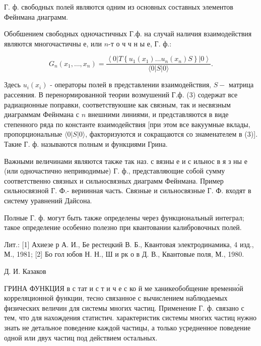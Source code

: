 \documentclass[10pt]{article}
\begin{document}
Г. ф. свободных полей являются одним из основных составных элементов Фейнмана диаграмм.



Обобшением свободных одночастичных Г.ф. на случай наличия взаимодействия являются многочастичны е, или $n$-т о ч ч н ы е, Г. ф.:



\[

G_{n}\left(x_{1}, \ldots, x_{n}\right)=\frac{\left\langle 0\left|T\left\{u_{1}\left(x_{1}\right) \ldots u_{n}\left(x_{n}\right) S\right\}\right| 0\right\rangle}{\langle 0|S| 0\rangle} .

\]



Здесь $u_{i}\left(x_{i}\right)$ - операторы полей в представлении взаимодействия, $S-$ матрица рассеяния. В перенормированной теории возмушений Г.ф. (3) содержат все радиационные поправки, соответствуюшие как связным, так и несвязным диаграммам Фейнмана с $n$ внешними линиями, и представляются в виде степенного ряда по константе взаимодействия [при этом все вакуумные вклады, пропорциональные $\langle 0|S| 0\rangle$, факторизуются и сокращаются со знаменателем в (3)]. Такие Г. ф. называются полным и функциями Грина.



Важными величинами являются также так наз. с вязны е и с ильнос в я з ны е (или одночастично неприводимые) Г. ф., представляющие собой сумму соответственно связных и сильносвязных диаграмм Фейнмана. Пример сильносвязной Г. Ф.- вериинная часть. Связные и сильносвязные Г. Ф. входят в систему уравнений Дайсона.



Полные Г. ф. могут быть также определены через функциональный интеграл; такое определение особенно полезно при квантовании калибровочных полей.



Лит.: [1] Ахиезе р А. И., Бе рестецкий В. Б., Квантовая электродинамика, 4 изд., М., 1981; [2] Бо гол юбов Н. Н., Ш и рк о в Д. В., Квантовые поля, М., 1980.



Д. И. Казаков



ГРИНА ФУНКЦИЯ в с тат и с т и ч е с ко й ме ханикеобобщение временно́й корреляционной функции, тесно связанное с вычислением наблюдаемых физических величин для системы многих частиц. Применение Г. ф. связано с тем, что для нахождения статистич. характеристик системы многих частиц нужно знать не детальное поведение каждой частицы, а только усредненное поведение одной или двух частиц под действием остальных.
\end{document}
